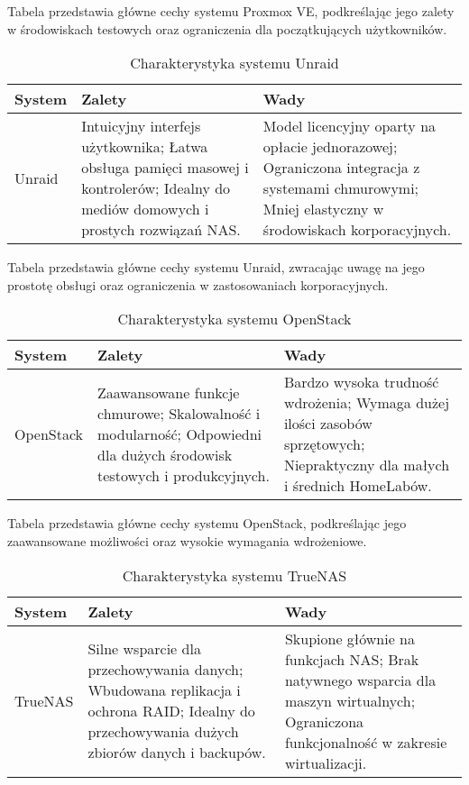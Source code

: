 Tabela przedstawia główne cechy systemu Proxmox VE, podkreślając jego zalety w środowiskach testowych oraz ograniczenia dla początkujących użytkowników.

\begin{table}[H]
\centering
\begin{tabular}{|p{3cm}|p{6cm}|p{6cm}|}
\hline
\textbf{System} & \textbf{Zalety} & \textbf{Wady} \\
\hline
Unraid &
Intuicyjny interfejs użytkownika; Łatwa obsługa pamięci masowej i kontrolerów; Idealny do mediów domowych i prostych rozwiązań NAS. &
Model licencyjny oparty na opłacie jednorazowej; Ograniczona integracja z systemami chmurowymi; Mniej elastyczny w środowiskach korporacyjnych. \\
\hline
\end{tabular}
\caption{Charakterystyka systemu Unraid}
\end{table}

Tabela przedstawia główne cechy systemu Unraid, zwracając uwagę na jego prostotę obsługi oraz ograniczenia w zastosowaniach korporacyjnych.

\begin{table}[H]
\centering
\begin{tabular}{|p{3cm}|p{6cm}|p{6cm}|}
\hline
\textbf{System} & \textbf{Zalety} & \textbf{Wady} \\
\hline
OpenStack &
Zaawansowane funkcje chmurowe; Skalowalność i modularność; Odpowiedni dla dużych środowisk testowych i produkcyjnych. &
Bardzo wysoka trudność wdrożenia; Wymaga dużej ilości zasobów sprzętowych; Niepraktyczny dla małych i średnich HomeLabów. \\
\hline
\end{tabular}
\caption{Charakterystyka systemu OpenStack}
\end{table}

Tabela przedstawia główne cechy systemu OpenStack, podkreślając jego zaawansowane możliwości oraz wysokie wymagania wdrożeniowe.

\begin{table}[H]
\centering
\begin{tabular}{|p{3cm}|p{6cm}|p{6cm}|}
\hline
\textbf{System} & \textbf{Zalety} & \textbf{Wady} \\
\hline
TrueNAS &
Silne wsparcie dla przechowywania danych; Wbudowana replikacja i ochrona RAID; Idealny do przechowywania dużych zbiorów danych i backupów. &
Skupione głównie na funkcjach NAS; Brak natywnego wsparcia dla maszyn wirtualnych; Ograniczona funkcjonalność w zakresie wirtualizacji. \\
\hline
\end{tabular}
\caption{Charakterystyka systemu TrueNAS}
\end{table}

